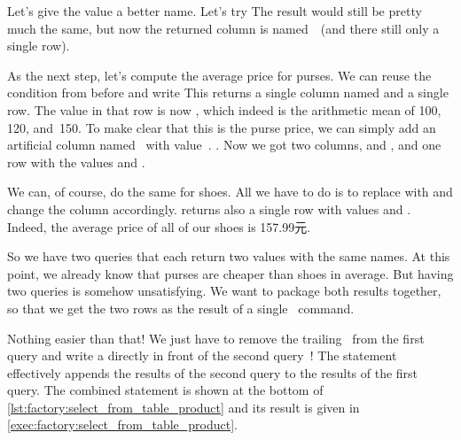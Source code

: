 Let's give the value a better name.
Let's try 
The result would still be pretty much the same, but now the returned column is named~~(and there still only a single row).%
%
\begin{sloppypar}%
As the next step, let's compute the average price for purses.
We can reuse the condition  from before and write 
This returns a single column named  and a single row.
The value in that row is now , which indeed is the arithmetic mean of 100, 120, and~150.
To make clear that this is the purse price, we can simply add an artificial column named~ with value~.
.
Now we got two columns,  and , and one row with the values  and .%
\end{sloppypar}%
%
\begin{sloppypar}%
We can, of course, do the same for shoes.
All we have to do is to replace  with  and change the  column accordingly.
 returns also a single row with values  and .
Indeed, the average price of all of our shoes is 157.99元.%
\end{sloppypar}%
%
So we have two queries that each return two values with the same names.
At this point, we already know that purses are cheaper than shoes in average.
But having two queries is somehow unsatisfying.
We want to package both results together, so that we get the two rows as the result of a single \sql\ command.

Nothing easier than that!
We just have to remove the trailing~\sqlil{;} from the first query and write a  directly in front of the second query~\cite{PGDG:PD:CQUIE}!
The  statement effectively appends the results of the second query to the results of the first query.
The combined statement is shown at the bottom of \cref{lst:factory:select_from_table_product} and its result is given in \cref{exec:factory:select_from_table_product}.


